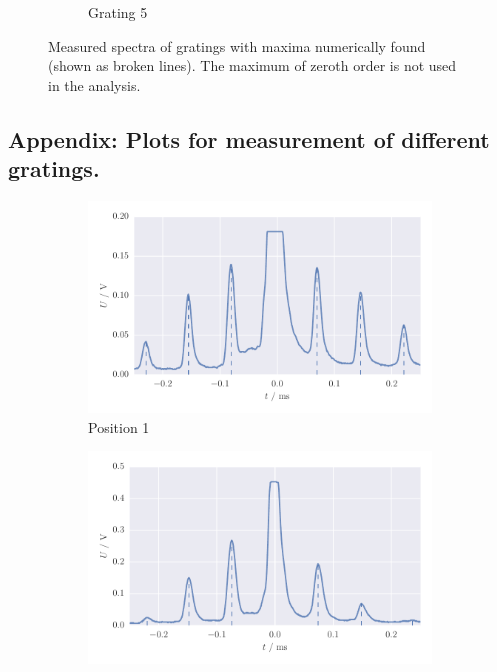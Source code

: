 \begin{figure}[H]
\begin{subfigure}[b]{\mpltw}
        \caption{Grating 5}
        \label{fig:gratings_maxi1}
    \end{subfigure}
    \caption{
        Measured spectra of gratings with maxima numerically found (shown as broken 
            lines). The maximum of zeroth order is not used in the analysis. 
        }
    \label{fig:gratings_maxima}
\end{figure}
\FloatBarrier

\subsection{Appendix: Plots for measurement of different gratings.}
\label{sec:appendix_aperture_plots}
\begin{figure}[H]
    \centering
    \begin{subfigure}[b]{\mpltw}
        \includegraphics[width=\textwidth]{figures/aperture_1b}
        \caption{Position 1}
        \label{}
    \end{subfigure}
    \begin{subfigure}[b]{\mpltw}
        \includegraphics[width=\textwidth]{figures/aperture_2b}

\end{subfigure}
\end{figure}
